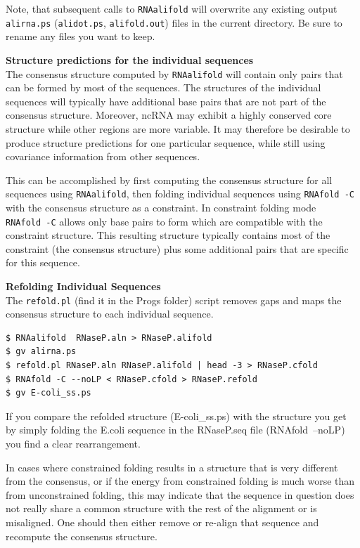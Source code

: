 \documentclass[]{article}
\begin{document}
Note, that subsequent calls to \texttt{RNAalifold} will overwrite any
existing output \texttt{alirna.ps} (\texttt{alidot.ps},
\texttt{alifold.out}) files in the current directory. Be sure to rename
any files you want to keep.

\textbf{Structure predictions for the individual sequences}\\
The consensus structure computed by \texttt{RNAalifold} will contain
only pairs that can be formed by most of the sequences. The structures
of the individual sequences will typically have additional base pairs
that are not part of the consensus structure. Moreover, ncRNA may
exhibit a highly conserved core structure while other regions are more
variable. It may therefore be desirable to produce structure predictions
for one particular sequence, while still using covariance information
from other sequences.

This can be accomplished by first computing the consensus structure for
all sequences using \texttt{RNAalifold}, then folding individual
sequences using \texttt{RNAfold\ -C} with the consensus structure as a
constraint. In constraint folding mode \texttt{RNAfold\ -C} allows only
base pairs to form which are compatible with the constraint structure.
This resulting structure typically contains most of the constraint (the
consensus structure) plus some additional pairs that are specific for
this sequence.

\textbf{Refolding Individual Sequences}\\
 The \texttt{refold.pl} (find it in the Progs folder) script removes gaps
and maps the consensus structure to each individual sequence.

\begin{verbatim}
$ RNAalifold  RNaseP.aln > RNaseP.alifold
$ gv alirna.ps
$ refold.pl RNaseP.aln RNaseP.alifold | head -3 > RNaseP.cfold
$ RNAfold -C --noLP < RNaseP.cfold > RNaseP.refold
$ gv E-coli_ss.ps
\end{verbatim}

If you compare the refolded structure ({{E-coli\_ss.ps}}) with the
structure you get by simply folding the E.coli sequence in the
RNaseP.seq file ({{RNAfold~--noLP}}) you find a clear rearrangement.

In cases where constrained folding results in a structure that is very
different from the consensus, or if the energy from constrained folding
is much worse than from unconstrained folding, this may indicate that
the sequence in question does not really share a common structure with
the rest of the alignment or is misaligned. One should then either
remove or re-align that sequence and recompute the consensus structure.
\end{document}
